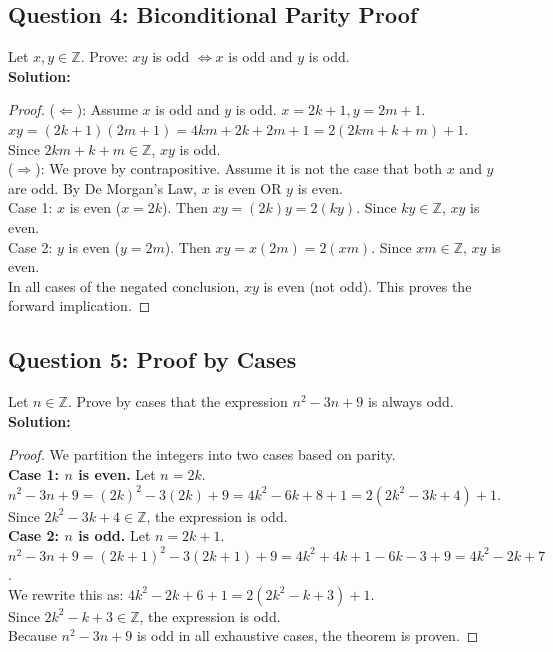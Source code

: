\documentclass[11pt]{article}
\begin{document}
\subsection*{Question 4: Biconditional Parity Proof}
Let $x, y \in \mathbb{Z}$. Prove: $xy$ is odd $\Leftrightarrow x$ is odd and $y$ is odd.\\
\textbf{Solution:}
\begin{proof}
($\Leftarrow$): Assume $x$ is odd and $y$ is odd. $x = 2k+1, y = 2m+1$. \\
$xy = (2k+1)(2m+1) = 4km + 2k + 2m + 1 = 2(2km + k + m) + 1$. \\
Since $2km+k+m \in \mathbb{Z}$, $xy$ is odd. \\
($\Rightarrow$): We prove by contrapositive. Assume it is not the case that both $x$ and $y$ are odd. By De Morgan's Law, $x$ is even OR $y$ is even. \\
Case 1: $x$ is even ($x=2k$). Then $xy = (2k)y = 2(ky)$. Since $ky \in \mathbb{Z}$, $xy$ is even. \\
Case 2: $y$ is even ($y=2m$). Then $xy = x(2m) = 2(xm)$. Since $xm \in \mathbb{Z}$, $xy$ is even. \\
In all cases of the negated conclusion, $xy$ is even (not odd). This proves the forward implication.
\end{proof}

\subsection*{Question 5: Proof by Cases}
Let $n \in \mathbb{Z}$. Prove by cases that the expression $n^2 - 3n + 9$ is always odd.\\
\textbf{Solution:}
\begin{proof}
We partition the integers into two cases based on parity. \\
\textbf{Case 1: $n$ is even.} Let $n = 2k$. \\
$n^2 - 3n + 9 = (2k)^2 - 3(2k) + 9 = 4k^2 - 6k + 8 + 1 = 2(2k^2 - 3k + 4) + 1$. \\
Since $2k^2-3k+4 \in \mathbb{Z}$, the expression is odd. \\
\textbf{Case 2: $n$ is odd.} Let $n = 2k+1$. \\
$n^2 - 3n + 9 = (2k+1)^2 - 3(2k+1) + 9 = 4k^2 + 4k + 1 - 6k - 3 + 9 = 4k^2 - 2k + 7$. \\
We rewrite this as: $4k^2 - 2k + 6 + 1 = 2(2k^2 - k + 3) + 1$. \\
Since $2k^2 - k + 3 \in \mathbb{Z}$, the expression is odd. \\
Because $n^2 - 3n + 9$ is odd in all exhaustive cases, the theorem is proven.
\end{proof}
\end{document}
